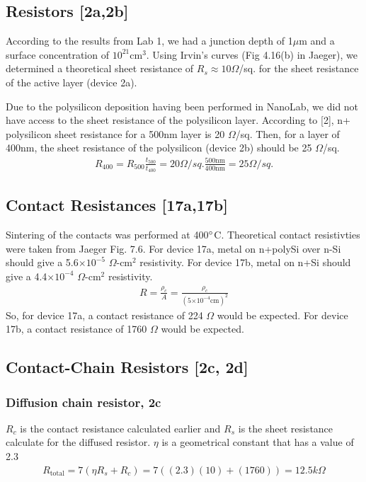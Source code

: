 \documentclass{article}
\providecommand{\e}[1]{\ensuremath{\times 10^{#1}}}
\begin{document}
\subsection{Resistors [2a,2b]}
According to the results from Lab 1, we had a junction depth of 1$\mu$m and a surface concentration of $10^{21}{\text{cm}}^3$. Using Irvin’s curves  (Fig 4.16(b) in Jaeger), we determined a theoretical sheet resistance of $R_s \approx 10 \Omega$/sq. for the sheet resistance of the active layer (device 2a).

Due to the polysilicon deposition having been performed in NanoLab, we did not have access to the sheet resistance of the polysilicon layer. According to [2], n+ polysilicon sheet resistance for a 500nm layer is 20 $\Omega$/sq. Then, for a layer of 400nm, the sheet resistance of the polysilicon (device 2b) should be 25 $\Omega$/sq.
\begin{align*}
R_{400}=R_{500}\frac{t_{500}}{t_{400}} =20\Omega/sq.\frac{500\text{nm}}{400\text{nm}} = 25 \Omega/sq.
\end{align*}

\subsection{Contact Resistances [17a,17b]}
Sintering of the contacts was performed at 400$\degree$C. Theoretical contact resistivties were taken from Jaeger Fig. 7.6. For device 17a, metal on n+polySi over n-Si should give a 5.6\e{-5} $\Omega$-$\text{cm}^2$ resistivity. For device 17b, metal on n+Si should give a 4.4\e{-4} $\Omega$-$\text{cm}^2$ resistivity. 
\begin{align*}
R=\frac{\rho_c}{A} =\frac{\rho_c}{(5\e{-4}\text{cm})^2}
\end{align*}
So, for device 17a, a contact resistance of 224 $\Omega$ would be expected. For device 17b, a contact resistance of 1760 $\Omega$ would be expected. 


\subsection{Contact-Chain Resistors [2c, 2d]}
\subsubsection{Diffusion chain resistor, 2c}
$R_c$ is the contact resistance calculated earlier and $R_s$ is the sheet resistance calculate for the diffused resistor. $\eta$ is a geometrical constant that has a value of 2.3
\begin{align*}
R_{\text{total}} = 7(\eta R_s + R_c) = 7((2.3)(10) + (1760)) = 12.5k\Omega
\end{align*}
\end{document}
